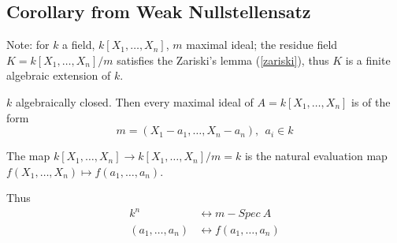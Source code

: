 \documentclass{article}
\theoremstyle{definition}
\newenvironment{cor}[1]
{\renewcommand\theinnercor{#1}\innercor}
{\endinnercor}
\begin{document}
\subsection{Corollary from Weak Nullstellensatz}
Note: for $k$ a field, $k[X_1, \ldots, X_n]$, $m$ maximal ideal; the residue field $K=k[X_1, \ldots, X_n]/m$ satisfies the Zariski's lemma (\ref{zariski}), thus $K$ is a finite algebraic extension of $k$.

\vspace{0.3cm}
\begin{cor}{5.2} \label{5.2}
  $k$ algebraically closed. Then every maximal ideal of $A = k[X_1, \ldots,
  X_n]$ is of the form
  $$m = (X_1 - a_1, \ldots, X_n -a_n),~~ a_i \in k$$

  The map $k[X_1, \ldots, X_n] \longrightarrow k[X_1, \ldots, X_n]/m=k$ is the natural evaluation map $f(X_1, \ldots, X_n) \longmapsto f(a_1, \ldots, a_n)$.

  Thus
  \begin{align*}
    k^n &\longleftrightarrow m-Spec~ A\\
    (a_1, \ldots, a_n) &\longleftrightarrow f(a_1, \ldots, a_n)
    \end{align*}
\end{cor}
\end{document}
